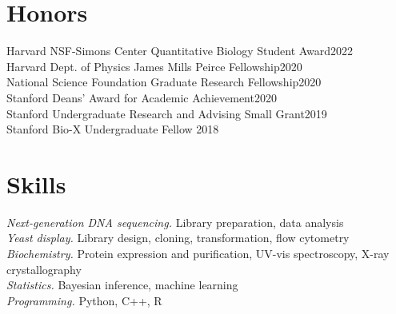 \documentclass[line,overlap,10pt]{res}
\begin{document}
\begin{resume}
\section{Honors}
 
Harvard NSF-Simons Center Quantitative Biology Student Award\hfill 2022 \\
Harvard Dept. of Physics James Mills Peirce Fellowship\hfill 2020 \\
National Science Foundation Graduate Research Fellowship\hfill 2020 \\
Stanford Deans' Award for Academic Achievement\hfill 2020 \\
Stanford Undergraduate Research and Advising Small Grant\hfill 2019 \\
Stanford Bio-X Undergraduate Fellow \hfill 2018

\section{Skills}

\textit{Next-generation DNA sequencing.} Library preparation, data analysis \\
\textit{Yeast display.} Library design, cloning, transformation, flow cytometry \\
\textit{Biochemistry.} Protein expression and purification, UV-vis spectroscopy, X-ray crystallography \\
\textit{Statistics.} Bayesian inference, machine learning \\
\textit{Programming.} Python, C++, R





\end{resume}
\end{document}
